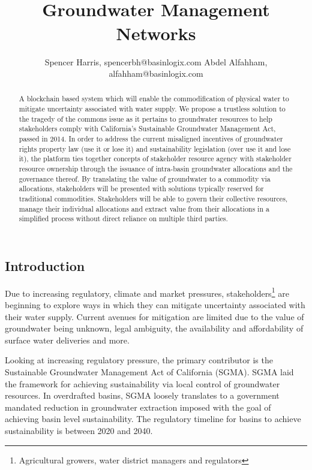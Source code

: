 \documentclass{tufte-handout}
\title[{}]{
 \\
\large Groundwater Management Networks}
\author[Spencer Harris, spencerbh@basinlogix.com]{{\scriptsize Spencer Harris, spencerbh@basinlogix.com \break Abdel Alfahham, alfahham@basinlogix.com}}
\begin{document}
\maketitle%
\begin{fullwidth}
\begin{abstract}
\noindent A blockchain based system which will enable the commodification of physical water to mitigate uncertainty associated with water supply. We propose a trustless solution to the tragedy of the commons issue as it pertains to groundwater resources to help stakeholders comply with California's Sustainable Groundwater Management Act, passed in 2014. In order to address the current misaligned incentives of groundwater rights property law (use it or lose it) and sustainability legislation (over use it and lose it), the platform ties together concepts of stakeholder resource agency with stakeholder resource ownership through the issuance of intra-basin groundwater allocations and the governance thereof. By translating the value of groundwater to a commodity via allocations, stakeholders will be presented with solutions typically reserved for traditional commodities. Stakeholders will be able to govern their collective resources, manage their individual allocations and extract value from their allocations in a simplified process without direct reliance on multiple third parties. 
\end{abstract}
\end{fullwidth}

\subsection{Introduction}\label{sec:headings}

Due to increasing regulatory, climate and market pressures, stakeholders\footnote{Agricultural growers, water district managers and regulators} are beginning to explore ways in which they can mitigate uncertainty associated with their water supply. Current avenues for mitigation are limited due to the value of groundwater being unknown, legal ambiguity, the availability and affordability of surface water deliveries and more. 

Looking at increasing regulatory pressure, the primary contributor is the Sustainable Groundwater Management Act of California (SGMA)\cite{SGMA}. SGMA laid the framework for achieving sustainability via local control of groundwater resources. In overdrafted basins, SGMA loosely translates to a government mandated reduction in groundwater extraction imposed with the goal of achieving basin level sustainability. The regulatory timeline for basins to achieve sustainability is between 2020 and 2040. 
\end{document}

